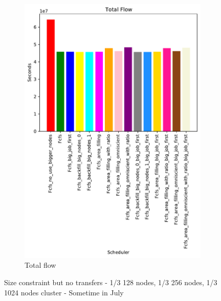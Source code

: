 \documentclass[a4paper]{article}
\begin{document}
\begin{figure}[H]
\begin{subfigure}[b]{0.4\linewidth}\centering\includegraphics[width=1\linewidth]{MBSS/plot/Size_Constraint_2022-01-24->2022-01-24_Total_flow_162_128_162_256_162_1024.pdf}\caption{Total flow}\label{12}\end{subfigure}
\caption{Size constraint but no transfers - 1/3 128 nodes, 1/3 256 nodes, 1/3 1024 nodes cluster - Sometime in July}\label{16}\end{figure}
\end{document}
